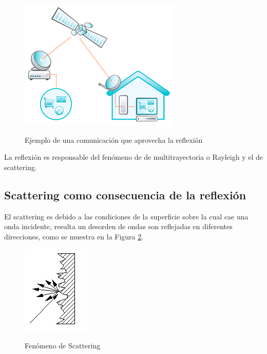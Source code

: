 	\begin{figure}[h!]
		\captionsetup{justification = raggedright, singlelinecheck = false}
		\caption{Ejemplo de una comunicación que aprovecha la reflexión} 
		\centering
		\includegraphics[scale=1]{Imagenes/Casa.png}
		\label{fig:Casa}
	\end{figure}
La reflexión es responsable del fenómeno de de multitrayectoria o Rayleigh y el de scattering. 

\subsection{Scattering como consecuencia de la reflexión}

El scattering es debido a las condiciones de la superficie sobre la cual cae una onda incidente, resulta un desorden de ondas son reflejadas en diferentes direcciones, como se muestra en la Figura \ref{fig:Refraccion}.
	
	\begin{figure}[h!]
		\captionsetup{justification = raggedright, singlelinecheck = false}
		\caption{Fenómeno de Scattering} 
		\centering
		\includegraphics[scale=1]{Imagenes/Refraccion.png}
		\label{fig:Refraccion}
	\end{figure}



